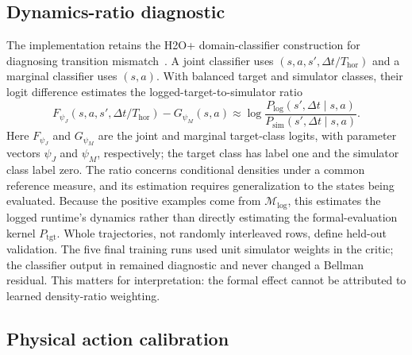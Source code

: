 \subsection{Dynamics-ratio diagnostic}
\label{sec:method:ratio}

The implementation retains the H2O+ domain-classifier construction for
diagnosing transition mismatch~\citep{eysenbach2021off,niu2025h2oplus}. A
joint classifier uses $(s,a,s',\Delta t/T_{\mathrm{hor}})$ and a marginal
classifier uses $(s,a)$. With balanced target and simulator classes, their
logit difference estimates the logged-target-to-simulator ratio
\begin{equation}
F_{\psi_J}(s,a,s',\Delta t/T_{\mathrm{hor}})
-G_{\psi_M}(s,a)
\approx
\log\frac{P_{\mathrm{log}}(s',\Delta t\mid s,a)}
          {P_{\mathrm{sim}}(s',\Delta t\mid s,a)}.
\label{eq:ratio_diagnostic}
\end{equation}
Here $F_{\psi_J}$ and $G_{\psi_M}$ are the joint and marginal target-class
logits, with parameter vectors $\psi_J$ and $\psi_M$, respectively; the target
class has label one and the simulator class label zero. The ratio concerns
conditional densities under a common reference measure, and its estimation
requires generalization to the states being evaluated. Because the positive
examples come from $\mathcal{M}_{\mathrm{log}}$, this estimates the logged
runtime's dynamics rather than directly estimating the formal-evaluation
kernel $P_{\mathrm{tgt}}$.
Whole trajectories, not randomly interleaved rows, define held-out validation.
The five final training runs used unit simulator weights in the critic; the
classifier output in  remained diagnostic and never
changed a Bellman residual. This matters for interpretation: the formal effect
cannot be attributed to learned density-ratio weighting.

\subsection{Physical action calibration}
\label{sec:method:reserve}

